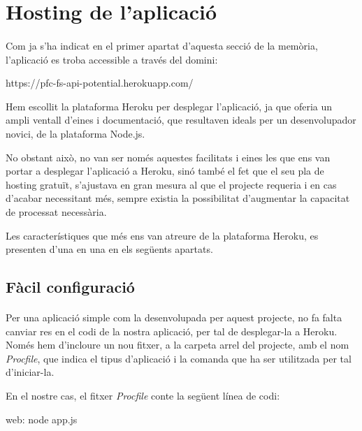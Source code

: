 \section{Hosting de l'aplicació}

    \paragraph{}
    Com ja s'ha indicat en el primer apartat d'aquesta secció de la memòria, l'aplicació es troba accessible a través del domini:

    \begin{displayquote}
        https://pfc-fs-api-potential.herokuapp.com/
    \end{displayquote}

    Hem escollit la plataforma Heroku per desplegar l'aplicació, ja que oferia un ampli ventall d'eines i documentació, que resultaven ideals per un desenvolupador novici, de la plataforma Node.js.

    No obstant això, no van ser només aquestes facilitats i eines les que ens van portar a desplegar l'aplicació a Heroku, sinó també el fet que el seu pla de hosting gratuït, s'ajustava en gran mesura al que el projecte requeria i en cas d'acabar necessitant més, sempre existia la possibilitat d'augmentar la capacitat de processat necessària.

    Les característiques que més ens van atreure de la plataforma Heroku, es presenten d'una en una en els següents apartats.

    \subsection{Fàcil configuració}

    \paragraph{}
    Per una aplicació simple com la desenvolupada per aquest projecte, no fa falta canviar res en el codi de la nostra aplicació, per tal de desplegar-la a Heroku. Només hem d'incloure un nou fitxer, a la carpeta arrel del projecte, amb el nom \emph{Procfile}, que indica el tipus d'aplicació i la comanda que ha ser utilitzada per tal d'iniciar-la.

    En el nostre cas, el fitxer \emph{Procfile} conte la següent línea de codi:

    \begin{displayquote}
        web: node app.js
    \end{displayquote}


